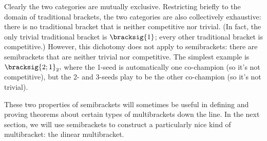 {    Clearly the two categories are mutually exclusive. Restricting briefly to the domain of traditional brackets, the two categories are also collectively exhaustive: there is no traditional bracket that is neither competitive nor trivial. (In fact, the only trivial traditional bracket is $\bracksig{1}$; every other traditional bracket is competitive.) However, this dichotomy does not apply to semibrackets: there are semibrackets that are neither trivial nor competitive. The simplest example is $\bracksig{2;1}_2,$ where the 1-seed is automatically one co-champion (so it's not competitive), but the 2- and 3-seeds play to be the other co-champion (so it's not trivial).


    These two properties of semibrackets will sometimes be useful in defining and proving theorems about certain types of multibrackets down the line. In the next section, we will use semibrackets to construct a particularly nice kind of multibracket: the \i{linear multibracket.}
}